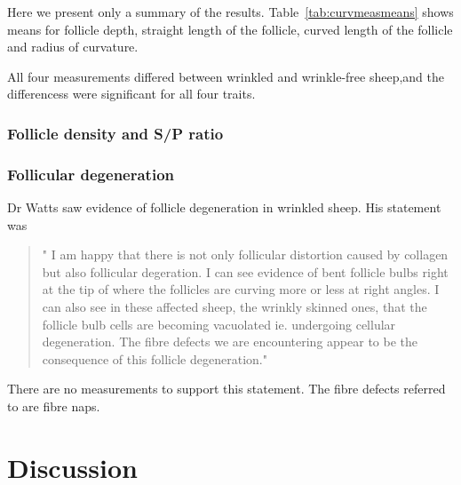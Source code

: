 \documentclass[titlepage]{article}  %
\begin{document}
Here we present only a summary of the results. Table~\ref{tab:curvmeasmeans} shows means for follicle depth, straight length of the follicle, curved length of the follicle and radius of curvature. 

All four measurements differed between wrinkled and wrinkle-free sheep,and the differencess were significant for all four traits.

\subsubsection{Follicle density and S/P ratio}

\subsubsection{Follicular degeneration}
Dr Watts saw evidence of follicle degeneration in wrinkled sheep. His statement was
\begin{quote}
"  I am happy that there is not only follicular distortion caused by collagen but also follicular degeration.  I can see evidence of bent follicle bulbs right at the tip of where the follicles are curving more or less at right angles.  I can also see in these affected sheep, the wrinkly skinned ones, that the follicle bulb cells are becoming vacuolated ie. undergoing cellular degeneration. The fibre defects we are encountering appear to be the consequence of this follicle degeneration."
\end{quote}

There are no measurements to support this statement. The fibre defects referred to are fibre naps. 

\clearpage
\section{Discussion}
\end{document}
